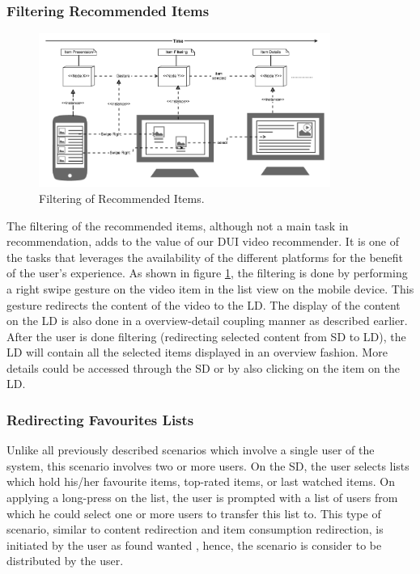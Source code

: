 \subsubsection{Filtering Recommended Items}
\begin{figure}[!htpb]
\includegraphics[width=0.85\textwidth, center, center]{figures/filtering}
\caption{Filtering of Recommended Items.}
\label{fig:figure39}
\end{figure}
The filtering of the recommended items, although not a main task in
recommendation, adds to the value of our DUI video recommender. It is one of the
tasks that leverages the availability of the different platforms for the benefit
of the user's experience. As shown in figure \ref{fig:figure39}, the filtering
is done by performing a right swipe gesture on the video item in the list view
on the mobile device. This gesture redirects the content of the video to the LD.
The display of the content on the LD is also done in a overview-detail coupling manner as described
earlier. After the user is done filtering (redirecting selected content from SD
to LD), the LD will contain all the selected items displayed in an overview
fashion. More details could be accessed through the SD or by also clicking on
the item on the LD.

\subsubsection{Redirecting Favourites Lists}
Unlike all previously described scenarios which involve a single user of the
system, this scenario involves two or more users. On the SD, the user selects
lists which hold his/her favourite items, top-rated items, or last watched
items. On applying a long-press on the list, the user is prompted with a list of
users from which he could select one or more users to transfer this list to.
This type of scenario, similar to content redirection and item consumption
redirection, is initiated by the user as found wanted , hence, the scenario is
consider to be distributed by the user.\\

